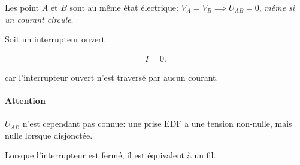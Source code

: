 \documentclass{article}
\begin{document}

Les point $A$ et $B$ sont au même état électrique: $V_A = V_B \implies U_{AB}=0$, \emph{même si un courant circule}.

Soit un interrupteur ouvert


\begin{align*}
	I=0
.\end{align*}

car l'interrupteur ouvert n'est traversé par aucun courant.

\paragraph{Attention} $U_{AB}$ n'est cependant pas connue:
une prise EDF a une tension non-nulle, mais nulle lorsque disjonctée.

Lorsque l'interrupteur est fermé, il est équivalent à un fil.
\end{document}
